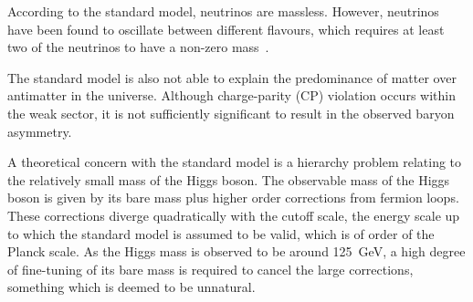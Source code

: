 According to the standard model, neutrinos are massless. However, neutrinos 
have been found to oscillate between different flavours, which requires at 
least two of the neutrinos to have a non-zero 
mass~\cite{neutrino-osc1,neutrino-osc2}.

The standard model is also not able to explain the predominance of matter over 
antimatter in the universe. Although charge-parity (CP) violation occurs within 
the weak sector, it is not sufficiently significant to result in the observed 
baryon asymmetry.

A theoretical concern with the standard model is a hierarchy problem relating 
to the relatively small mass of the Higgs boson. The observable mass of the 
Higgs boson is given by its bare mass plus higher order corrections from 
fermion loops. These 
corrections diverge quadratically with the cutoff scale, the energy scale up to 
which the standard model is assumed to be valid, which is of order of the %
Planck scale. 
As the Higgs mass is observed to be around 125~GeV, a high degree of 
fine-tuning of its bare mass is required to cancel the large corrections, 
something which is deemed to be unnatural. %

